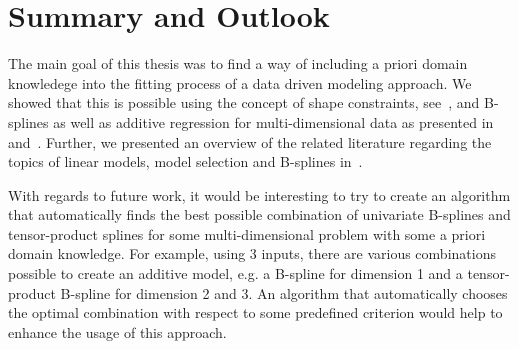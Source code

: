 \chapter{Summary and Outlook} \label{cha:summary}

The main goal of this thesis was to find a way of including a priori domain knowledege into the fitting process of a data driven modeling approach. We showed that this is possible using the concept of shape constraints, see~, and B-splines as well as additive regression for multi-dimensional data as presented in~ and~. Further, we presented an overview of the related literature regarding the topics of linear models, model selection and B-splines in~. 

With regards to future work, it would be interesting to try to create an algorithm that automatically finds the best possible combination of univariate B-splines and tensor-product splines for some multi-dimensional problem with some a priori domain knowledge. For example, using 3 inputs, there are various combinations possible to create an additive model, e.g. a B-spline for dimension 1 and a tensor-product B-spline for dimension 2 and 3. An algorithm that automatically chooses the optimal combination with respect to some predefined criterion would help to enhance the usage of this approach.   
